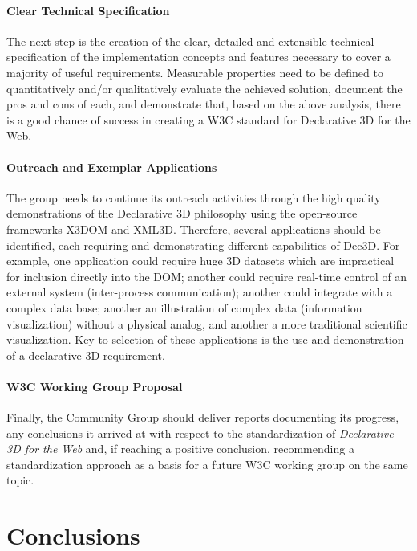 \documentclass{acmsiggraph}
\begin{document}
\paragraph{Clear Technical Specification}
The next step is the creation of the clear, detailed and extensible technical specification of the implementation concepts and features necessary to cover a majority of useful requirements. Measurable properties need to be defined to quantitatively and/or qualitatively evaluate the achieved solution, document the pros and cons of each, and demonstrate that, based on the above analysis, there is a good chance of success in creating a W3C standard for Declarative 3D for the Web.

\paragraph{Outreach and Exemplar Applications}
The group needs to continue its outreach activities through the high quality demonstrations of the Declarative 3D philosophy using the open-source frameworks X3DOM and XML3D. Therefore, several applications should be identified, each requiring and demonstrating different capabilities of Dec3D. For example, one application could require huge 3D datasets which are impractical for inclusion directly into the DOM; another could require real-time control of an external system (inter-process communication); another could integrate with a complex data base; another an illustration of complex data (information visualization) without a physical analog, and another a more traditional scientific visualization. Key to selection of these applications is the use and demonstration of a declarative 3D requirement.

\paragraph{W3C Working Group Proposal}
Finally, the Community Group should deliver reports documenting its progress, any conclusions it arrived at with respect to the standardization of \textit{Declarative 3D for the Web} and, if reaching a positive conclusion, recommending a standardization approach as a basis for a future W3C working group on the same topic.


\section{Conclusions}
\label{sec:Conclusions}
\end{document}
